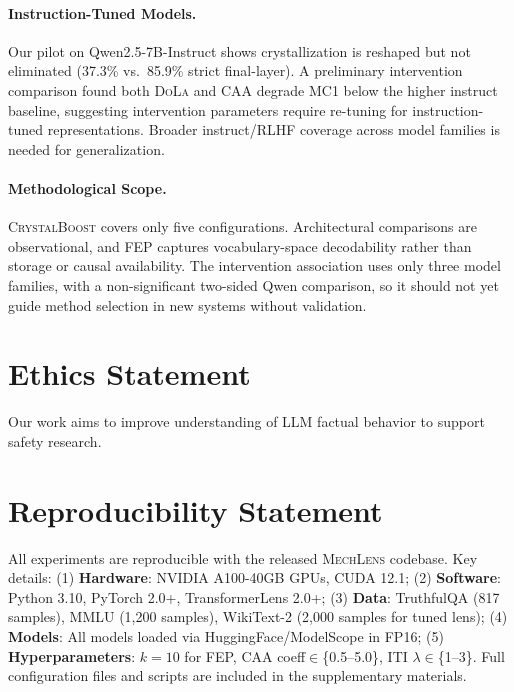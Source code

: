 \documentclass[11pt]{article}
\newcommand{\mechlens}{\textsc{MechLens}}
\newcommand{\dola}{\textsc{DoLa}}
\newcommand{\crystalboost}{\textsc{CrystalBoost}}
\newcommand{\caa}{\textsc{CAA}}
\begin{document}
\paragraph{Instruction-Tuned Models.} Our pilot on Qwen2.5-7B-Instruct shows crystallization is reshaped but not eliminated (37.3\% vs.\ 85.9\% strict final-layer). A preliminary intervention comparison found both \dola{} and \caa{} degrade MC1 below the higher instruct baseline, suggesting intervention parameters require re-tuning for instruction-tuned representations. Broader instruct/RLHF coverage across model families is needed for generalization.

\paragraph{Methodological Scope.} \crystalboost{} covers only five configurations. Architectural comparisons are observational, and FEP captures vocabulary-space decodability rather than storage or causal availability. The intervention association uses only three model families, with a non-significant two-sided Qwen comparison, so it should not yet guide method selection in new systems without validation.

\section*{Ethics Statement}
Our work aims to improve understanding of LLM factual behavior to support safety research.

\section*{Reproducibility Statement}
All experiments are reproducible with the released \mechlens{} codebase. Key details: (1) \textbf{Hardware}: NVIDIA A100-40GB GPUs, CUDA 12.1; (2) \textbf{Software}: Python 3.10, PyTorch 2.0+, TransformerLens 2.0+; (3) \textbf{Data}: TruthfulQA (817 samples), MMLU (1,200 samples), WikiText-2 (2,000 samples for tuned lens); (4) \textbf{Models}: All models loaded via HuggingFace/ModelScope in FP16; (5) \textbf{Hyperparameters}: $k{=}10$ for FEP, CAA coeff$\in$\{0.5--5.0\}, ITI $\lambda\in$\{1--3\}. Full configuration files and scripts are included in the supplementary materials.



\appendix
\end{document}
